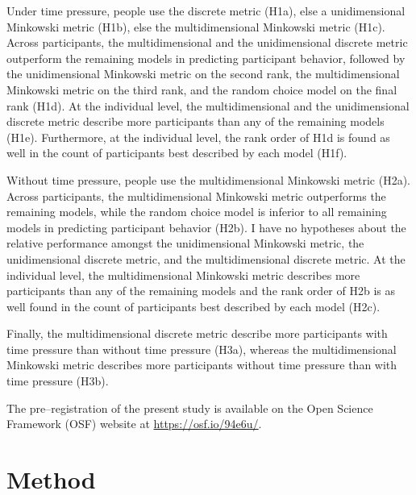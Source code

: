 \documentclass[a4paper,man,natbib]{apa6}
\begin{document}
Under time pressure, people use the discrete metric (H1a), else a unidimensional Minkowski metric (H1b), else the multidimensional Minkowski metric (H1c). Across participants, the multidimensional and the unidimensional discrete metric outperform the remaining models in predicting participant behavior, followed by the unidimensional Minkowski metric on the second rank, the multidimensional Minkowski metric on the third rank, and the random choice model on the final rank (H1d). At the individual level, the multidimensional and the unidimensional discrete metric describe more participants than any of the remaining models (H1e). Furthermore, at the individual level, the rank order of H1d is found as well in the count of participants best described by each model (H1f). 

Without time pressure, people use the multidimensional Minkowski metric (H2a). Across participants, the multidimensional Minkowski metric outperforms the remaining models, while the random choice model is inferior to all remaining models in predicting participant behavior (H2b). I have no hypotheses about the relative performance amongst the unidimensional Minkowski metric, the unidimensional discrete metric, and the multidimensional discrete metric. At the individual level, the multidimensional Minkowski metric describes more participants than any of the remaining models and the rank order of H2b is as well found in the count of participants best described by each model (H2c). 

Finally, the multidimensional discrete metric describe more participants with time pressure than without time pressure (H3a), whereas the multidimensional Minkowski metric describes more participants without time pressure than with time pressure (H3b).

The pre--registration of the present study is available on the Open Science Framework (OSF) website at \href{https://osf.io/94e6u/}{https://osf.io/94e6u/}.

\section{Method}
\end{document}
